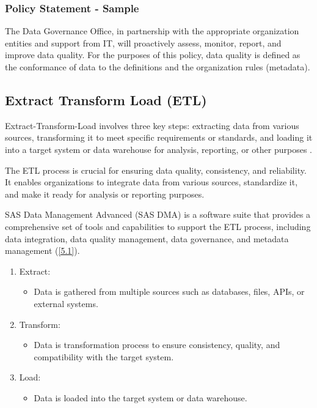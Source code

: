 \subsubsection{Policy Statement - Sample}
The Data Governance Office, in partnership with the appropriate organization entities and support from IT, will proactively assess, monitor, report, and improve data quality. For the purposes of this policy, data quality is defined as the conformance of data to the definitions and the organization rules (metadata).

\subsection{Extract Transform Load (ETL)} \label{ETL}
Extract-Transform-Load involves three key steps: extracting data from various sources, transforming it to meet specific requirements or standards, and loading it into a target system or data warehouse for analysis, reporting, or other purposes \cite{IBM2}.

The ETL process is crucial for ensuring data quality, consistency, and reliability. It enables organizations to integrate data from various sources, standardize it, and make it ready for analysis or reporting purposes.

SAS Data Management Advanced (SAS DMA) is a software suite that provides a comprehensive set of tools and capabilities to support the ETL process, including data integration, data quality management, data governance, and metadata management (\ref{5.1}).

\begin{enumerate}
    \item Extract:
    \begin{itemize}
        \item Data is gathered from multiple sources such as databases, files, APIs, or external systems. 
    \end{itemize}
    \item Transform:
    \begin{itemize}
        \item Data is transformation process to ensure consistency, quality, and compatibility with the target system.
    \end{itemize}
    \item Load:
    \begin{itemize}
        \item Data is loaded into the target system or data warehouse.
    \end{itemize}
\end{enumerate}

